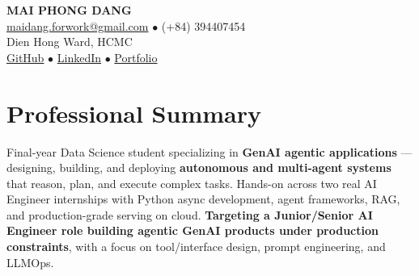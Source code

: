 \documentclass[a4paper,10pt]{article}
\begin{document}
\begin{center}
  {\LARGE\bfseries MAI PHONG DANG} \\[0.2em]
  \href{mailto:maidang.forwork@gmail.com}{\color{darkblue}maidang.forwork@gmail.com} $\bullet$ (+84) 394407454 \\[0.1em]
  Dien Hong Ward, HCMC \\[0.1em]
  \href{https://github.com/theAbyssOfTime2004}{\color{darkblue}GitHub} $\bullet$
  \href{https://www.linkedin.com/in/mai-%C4%91%C4%83ng-124b13302/}{\color{darkblue}LinkedIn} $\bullet$
  \href{https://theabyssoftime2004.github.io/}{\color{darkblue}Portfolio}
\end{center}

\vspace{-0.1em}

\section{Professional Summary}
Final-year Data Science student specializing in \textbf{GenAI agentic applications} — designing, building, and deploying \textbf{autonomous and multi-agent systems} that reason, plan, and execute complex tasks. Hands-on across two real AI Engineer internships with Python async development, agent frameworks, RAG, and production-grade serving on cloud. \textbf{Targeting a Junior/Senior AI Engineer role building agentic GenAI products under production constraints}, with a focus on tool/interface design, prompt engineering, and LLMOps.

\end{document}
